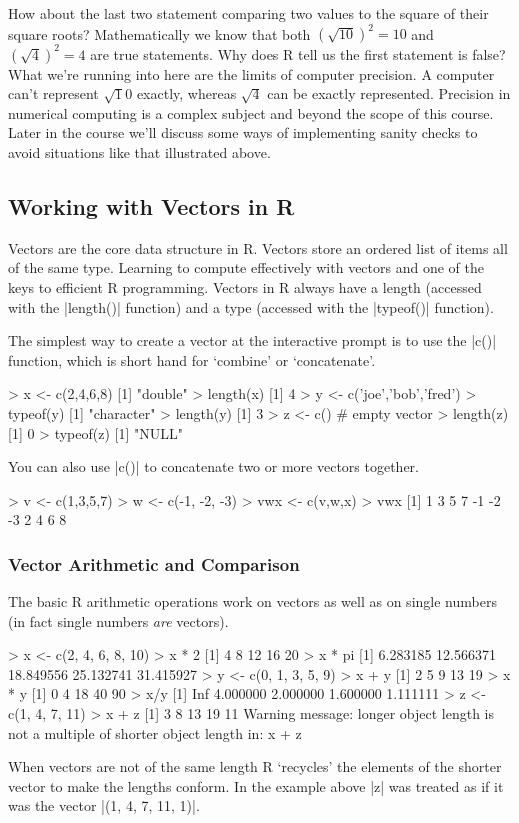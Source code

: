 How about the last two statement comparing two values to the square of
their square roots? Mathematically we know that both
$(\sqrt{10})^2 = 10$ and $(\sqrt{4})^2 = 4$ are true statements. Why
does R tell us the first statement is false? What we're running into
here are the limits of computer precision. A computer can't represent
$\sqrt 10$ exactly, whereas $\sqrt 4$ can be exactly represented.
Precision in numerical computing is a complex subject and beyond the
scope of this course. Later in the course we'll discuss some ways of
implementing sanity checks to avoid situations like that illustrated
above.

\subsection{Working with Vectors in R}

Vectors are the core data structure in R. Vectors store an ordered list of items all of the same type. Learning to compute effectively with vectors and one of the keys to efficient R programming.  Vectors in R always have a length (accessed with the |length()| function) and a type (accessed with the |typeof()| function).  

The simplest way to create a vector at the interactive prompt is to use the |c()| function, which is short hand for `combine' or `concatenate'.

\begin{R}
> x <- c(2,4,6,8)
[1] "double"
> length(x)
[1] 4
> y <- c('joe','bob','fred')
> typeof(y)
[1] "character"
> length(y)
[1] 3
> z <- c() # empty vector
> length(z)
[1] 0
> typeof(z)
[1] "NULL"
\end{R}

You can also use |c()| to concatenate two or more vectors together.
%
\begin{R}
> v <- c(1,3,5,7)
> w <- c(-1, -2, -3)
> vwx <- c(v,w,x)
> vwx
 [1]  1  3  5  7 -1 -2 -3  2  4  6  8
\end{R}

\subsubsection{Vector Arithmetic and Comparison}

The basic R arithmetic operations work on vectors as well as on
single numbers (in fact single numbers \emph{are} vectors).
%
\begin{R}
> x <- c(2, 4, 6, 8, 10)
> x * 2
[1]  4  8 12 16 20
> x * pi
[1]  6.283185 12.566371 18.849556 25.132741 31.415927
> y <- c(0, 1, 3, 5, 9)
> x + y
[1]  2  5  9 13 19
> x * y
[1]  0  4 18 40 90
> x/y
[1]      Inf 4.000000 2.000000 1.600000 1.111111
> z <- c(1, 4, 7, 11)
> x + z
[1]  3  8 13 19 11
Warning message:
longer object length
        is not a multiple of shorter object length in: x + z
\end{R}
%
When vectors are not of the same length R `recycles' the elements of the
shorter vector to make the lengths conform. In the example above
|z| was treated as if it was the vector |(1, 4, 7, 11, 1)|.


